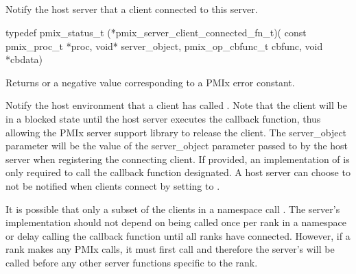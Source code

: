 \subsection{}

\summary

Notify the host server that a client connected to this server.

\format

\cspecificstart
\begin{codepar}
typedef pmix_status_t (*pmix_server_client_connected_fn_t)(
                             const pmix_proc_t *proc,
                             void* server_object,
                             pmix_op_cbfunc_t cbfunc,
                             void *cbdata)
\end{codepar}
\cspecificend

\begin{arglist}
\end{arglist}

Returns  or a negative value corresponding to a PMIx error constant.

\descr

Notify the host environment that a client has called .
Note that the client will be in a blocked state until the host server executes the callback function, thus allowing the \ac{PMIx} server support library to release
the client.
The server_object parameter will be the value of the server_object parameter passed to
 by the host server when registering the connecting client.  If provided, an implementation of 
is only required to
call the callback function designated.  A host server can choose to not be notified when clients connect by setting  to .

It is possible that only a subset of the clients in a namespace call .   The server's  implementation
should not depend on being called once per rank in a namespace or delay calling the callback function until all ranks have connected.
However, if a rank makes any \ac{PMIx} calls, it must first call  and
therefore the server's  will be called before any other server functions specific to the rank.

